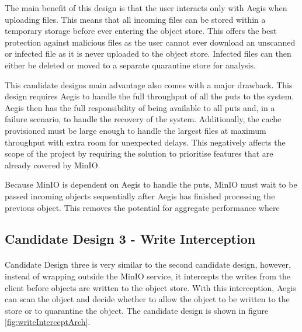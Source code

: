 \documentclass[12pt, conference, final, a4paper, onecolumn, compsoc]{IEEEtran}
\begin{document}
The main benefit of this design is that the user interacts only with Aegis when
uploading files. This means that all incoming files can be stored within a
temporary storage before ever entering the object store. This offers the best
protection against malicious files as the user cannot ever download an unscanned
or infected file as it is never uploaded to the object store. Infected files can
then either be deleted or moved to a separate quarantine store for analysis.

This candidate designs main advantage also comes with a major drawback. This
design requires Aegis to handle the full throughput of all the puts to the
system. Aegis then has the full responsibility of being available to all puts
and, in a failure scenario, to handle the recovery of the system. Additionally,
the cache provisioned must be large enough to handle the largest files at
maximum throughput with extra room for unexpected delays. This negatively
affects the scope of the project by requiring the solution to prioritise
features that are already covered by MinIO.


Because MinIO is dependent on Aegis to handle the puts, MinIO must wait to be
passed incoming objects sequentially after Aegis has finished processing the
previous object. This removes the potential for aggregate performance where


\subsection{Candidate Design 3 - Write Interception}
\paragraph{}

Candidate Design three is very similar to the second candidate design, however,
instead of wrapping outside the MinIO service, it intercepts the writes from the
client before objects are written to the object store. With this interception,
Aegis can scan the object and decide whether to allow the object to be written
to the store or to quarantine the object. The candidate design is shown in
figure \ref{fig:writeInterceptArch}.
\end{document}
